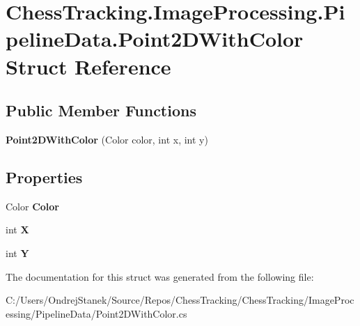 \hypertarget{struct_chess_tracking_1_1_image_processing_1_1_pipeline_data_1_1_point2_d_with_color}{}\section{Chess\+Tracking.\+Image\+Processing.\+Pipeline\+Data.\+Point2\+D\+With\+Color Struct Reference}
\label{struct_chess_tracking_1_1_image_processing_1_1_pipeline_data_1_1_point2_d_with_color}
\subsection*{Public Member Functions}
\begin{DoxyCompactItemize}
\item 
\mbox{\label{struct_chess_tracking_1_1_image_processing_1_1_pipeline_data_1_1_point2_d_with_color_a840ea0f81d6348811ea2e18700f902c8}} 
{\bfseries Point2\+D\+With\+Color} (Color color, int x, int y)
\end{DoxyCompactItemize}
\subsection*{Properties}
\begin{DoxyCompactItemize}
\item 
\mbox{\label{struct_chess_tracking_1_1_image_processing_1_1_pipeline_data_1_1_point2_d_with_color_acfe6e7cadc620cde5674b5cc3f22619f}} 
Color {\bfseries Color}
\item 
\mbox{\label{struct_chess_tracking_1_1_image_processing_1_1_pipeline_data_1_1_point2_d_with_color_aed31d3fda6312323df8ded812733acfd}} 
int {\bfseries X}
\item 
\mbox{\label{struct_chess_tracking_1_1_image_processing_1_1_pipeline_data_1_1_point2_d_with_color_a1ec2f86a62fb54fc0b9b6673107fb05b}} 
int {\bfseries Y}
\end{DoxyCompactItemize}


The documentation for this struct was generated from the following file\+:\begin{DoxyCompactItemize}
\item 
C\+:/\+Users/\+Ondrej\+Stanek/\+Source/\+Repos/\+Chess\+Tracking/\+Chess\+Tracking/\+Image\+Processing/\+Pipeline\+Data/Point2\+D\+With\+Color.\+cs\end{DoxyCompactItemize}
